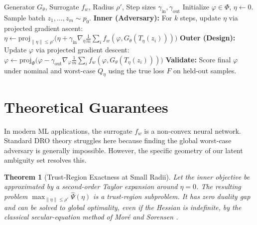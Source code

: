 \documentclass[11pt]{article}
\newtheorem{theorem}{Theorem}
\newcommand{\Phibox}{\Phi}
\newcommand{\design}{\varphi}
\newcommand{\latent}{z}
\newcommand{\surr}{f_w}
\newcommand{\base}{p_0}
\begin{document}
\begin{algorithm}[h]
\caption{DRO with a Latent Adversary}
\begin{algorithmic}[1]
\REQUIRE Generator $G_\theta$, Surrogate $\surr$, Radius $\rho'$, Step sizes $\gamma_{\text{in}}, \gamma_{\text{out}}$
\STATE Initialize $\design \in \Phibox$, $\eta \leftarrow 0$.
    \STATE Sample batch $\latent_1,\dots,\latent_m \sim \base$.
    \STATE \textbf{Inner (Adversary):} For $k$ steps, update $\eta$ via projected gradient ascent: \\
    $\eta \leftarrow \mathrm{proj}_{\|\eta\|\le\rho'} \big(\eta + \gamma_{\text{in}}\nabla_\eta \tfrac1m\sum_i \surr(\design, G_\theta(T_\eta(\latent_i)))\big)$
    \STATE \textbf{Outer (Design):} Update $\design$ via projected gradient descent: \\
    $\design \leftarrow \mathrm{proj}_{\Phibox}\big(\design - \gamma_{\text{out}} \nabla_\design \tfrac1m\sum_i \surr(\design, G_\theta(T_\eta(\latent_i)))\big)$
\ENDWHILE
\STATE \textbf{Validate:} Score final $\design$ under nominal and worst-case $Q_\eta$ using the true loss $F$ on held-out samples.
\end{algorithmic}
\end{algorithm}

\section{Theoretical Guarantees}
\label{sec:theory}

In modern ML applications, the surrogate $\surr$ is a non-convex neural network. Standard DRO theory struggles here because finding the global worst-case adversary is generally impossible. However, the specific geometry of our latent ambiguity set resolves this.

\begin{theorem}[Trust-Region Exactness at Small Radii]
\label{thm:trs}
Let the inner objective be approximated by a second-order Taylor expansion around $\eta=0$. The resulting problem $\max_{\|\eta\|\le\rho'}\widehat\Psi(\eta)$ is a trust-region subproblem. It has zero duality gap and can be solved to global optimality, \emph{even if the Hessian is indefinite}, by the classical secular-equation method of Mor\'e and Sorensen \citep{more1983}.
\end{theorem}
\end{document}
